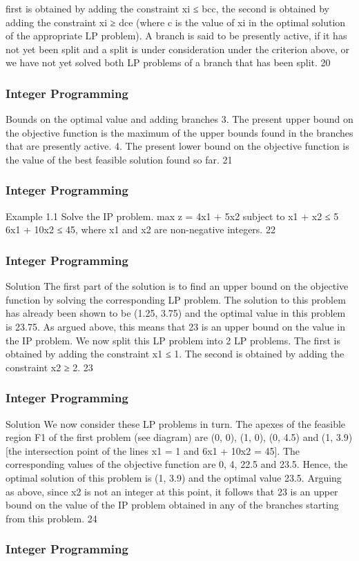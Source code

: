 \begin{frame}
first is obtained by adding the constraint xi ≤ bcc, the second is
obtained by adding the constraint xi ≥ dce (where c is the value of
xi
in the optimal solution of the appropriate LP problem).
A branch is said to be presently active, if it has not yet been split
and a split is under consideration under the criterion above, or we
have not yet solved both LP problems of a branch that has been
split.
20 \end{frame}  \begin{frame} \frametitle{Integer Programming}     
Bounds on the optimal value and adding branches
3. The present upper bound on the objective function is
the maximum of the upper bounds found in the
branches that are presently active.
4. The present lower bound on the objective function is
the value of the best feasible solution found so far.
21 \end{frame}  \begin{frame} \frametitle{Integer Programming}     
Example 1.1
Solve the IP problem.
max z = 4x1 + 5x2
subject to
x1 + x2 ≤ 5
6x1 + 10x2 ≤ 45,
where x1 and x2 are non-negative integers.
22 \end{frame}  \begin{frame} \frametitle{Integer Programming}     
Solution
The first part of the solution is to find an upper bound on the
objective function by solving the corresponding LP problem.
The solution to this problem has already been shown to be (1.25,
3.75) and the optimal value in this problem is 23.75. As argued
above, this means that 23 is an upper bound on the value in the IP
problem.
We now split this LP problem into 2 LP problems. The first is
obtained by adding the constraint x1 ≤ 1. The second is obtained
by adding the constraint x2 ≥ 2.
23 \end{frame}  \begin{frame} \frametitle{Integer Programming}     
Solution
We now consider these LP problems in turn. The apexes of the
feasible region F1 of the first problem (see diagram) are (0, 0), (1,
0), (0, 4.5) and (1, 3.9) [the intersection point of the lines x1 = 1
and 6x1 + 10x2 = 45].
The corresponding values of the objective function are 0, 4, 22.5
and 23.5. Hence, the optimal solution of this problem is (1, 3.9)
and the optimal value 23.5.
Arguing as above, since x2 is not an integer at this point, it follows
that 23 is an upper bound on the value of the IP problem obtained
in any of the branches starting from this problem.
24 \end{frame}  \begin{frame} \frametitle{Integer Programming}     

\end{frame}
